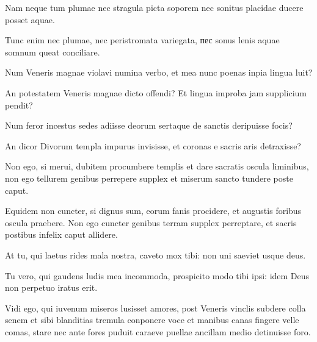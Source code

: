 {\large

\noindent Nam neque tum plumae nec stragula picta soporem nec sonitus placidae ducere posset aquae.\\

}


\noindent Tunc enim nec plumae, nec peristromata variegata, пес sonus lenis aquae somnum queat conciliare. \\

{\large

\noindent Num Veneris magnae violavi numina verbo, et mea nunc poenas inpia lingua luit?\\

}


\noindent An potestatem Veneris magnae dicto offendi? Et lingua improba jam supplicium pendit? \\

{\large

\noindent Num feror incestus sedes adiisse deorum sertaque de sanctis deripuisse focis?\\

}


\noindent An dicor Divorum templa impurus invisisse, et coronas e sacris aris detraxisse? \\

{\large

\noindent Non ego, si merui, dubitem procumbere templis et dare sacratis oscula liminibus, non ego tellurem genibus perrepere supplex et miserum sancto tundere poste caput.\\

}


\noindent Equidem non cuncter, si dignus sum, eorum fanis procidere, et augustis foribus oscula praebere. Non ego cuncter genibus terram supplex perreptare, et sacris postibus infelix caput allidere. \\

{\large

\noindent At tu, qui laetus rides mala nostra, caveto mox tibi: non uni saeviet usque deus.\\

}


\noindent Tu vero, qui gaudens ludis mea incommoda, prospicito modo tibi ipsi: idem Deus non perpetuo iratus erit. \\

{\large

\noindent Vidi ego, qui iuvenum miseros lusisset amores, post Veneris vinclis subdere colla senem et sibi blanditias tremula conponere voce et manibus canas fingere velle comas, stare nec ante fores puduit caraeve puellae ancillam medio detinuisse foro.\\

}


